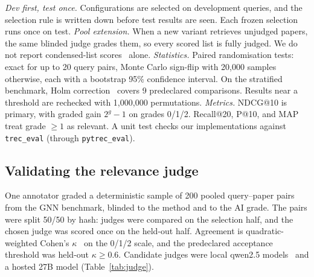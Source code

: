 \documentclass[conference]{IEEEtran}
\begin{document}
\emph{Dev first, test once.} Configurations are selected on development queries, and the selection rule is written down before test results are seen. Each frozen selection runs once on test.
\emph{Pool extension.} When a new variant retrieves unjudged papers, the same blinded judge grades them, so every scored list is fully judged. We do not report condensed-list scores~\cite{sakai2007bpref} alone.
\emph{Statistics.} Paired randomisation tests: exact for up to 20 query pairs, Monte Carlo sign-flip with 20,000 samples otherwise, each with a bootstrap 95\% confidence interval. On the stratified benchmark, Holm correction~\cite{holm1979simple} covers 9 predeclared comparisons. Results near a threshold are rechecked with 1,000,000 permutations.
\emph{Metrics.} NDCG@10 is primary, with graded gain $2^g - 1$ on grades 0/1/2. Recall@20, P@10, and MAP treat grade $\geq 1$ as relevant. A unit test checks our implementations against \texttt{trec\_eval} (through \texttt{pytrec\_eval}).

\subsection{Validating the relevance judge}
\label{sec:judge}

One annotator graded a deterministic sample of 200 pooled query--paper pairs from the GNN benchmark, blinded to the method and to the AI grade. The pairs were split 50/50 by hash: judges were compared on the selection half, and the chosen judge was scored once on the held-out half. Agreement is quadratic-weighted Cohen's $\kappa$~\cite{cohen1968weighted} on the 0/1/2 scale, and the predeclared acceptance threshold was held-out $\kappa \geq 0.6$. Candidate judges were local qwen2.5 models~\cite{qwen2024qwen25} and a hosted 27B model (Table~\ref{tab:judge}).

\begin{table}[t]
\centering
\caption{Judge agreement with a human annotator (quadratic-weighted $\kappa$, GNN pairs)}
\label{tab:judge}
\end{table}
\end{document}
